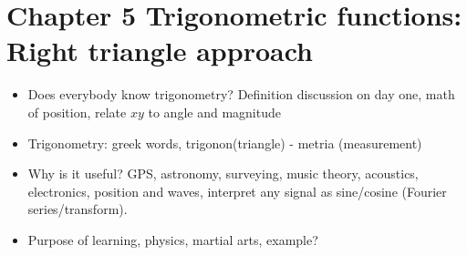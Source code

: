 \documentclass{article}
\begin{document}
\section{Chapter 5 Trigonometric functions: Right triangle approach}
\begin{itemize}
\item Does everybody know trigonometry? Definition discussion on day one, math of position, relate $xy$ to angle and magnitude
\item Trigonometry: greek words, trigonon(triangle) - metria (measurement)
\item Why is it useful? GPS, astronomy, surveying, music theory, acoustics, electronics, position and waves, interpret any signal as sine/cosine (Fourier series/transform).
\item Purpose of learning, physics, martial arts, example?
\end{itemize}

\end{document}
